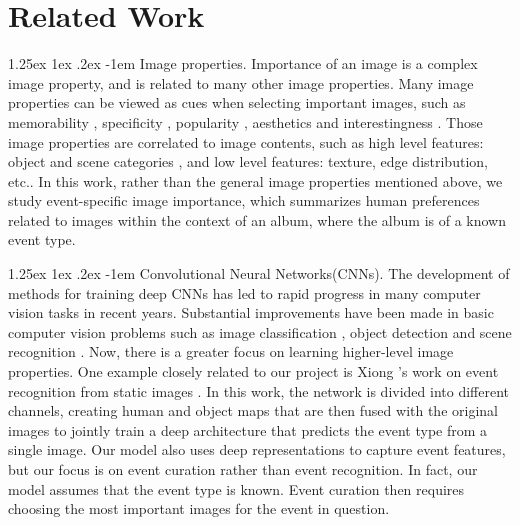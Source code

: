 \documentclass[10pt,twocolumn,letterpaper]{article}
\makeatletter
\renewcommand\paragraph{\@startsection{paragraph}{4}{\z@}%
           {1.25ex \@plus1ex \@minus.2ex}%
           {-1em}%
           {\normalfont\normalsize\bfseries}}
\makeatother
\begin{document}
\section{Related Work}

\paragraph{Image properties.}
Importance of an image is a complex image property, and is related to many other image properties. Many image properties can be viewed as cues when selecting important images, such as memorability \cite{Isola2011, NIPS2011_4451}, specificity \cite{specificity}, popularity \cite{www14_khosla}, aesthetics and interestingness \cite{interesting, interesting2}. Those image properties are correlated to image contents, such as high level features: object and scene categories \cite{Isola2011, NIPS2011_4451, specificity, www14_khosla, interesting}, and low level features: texture, edge distribution, etc.\cite{interesting2, www14_khosla}. In this work, rather than the general image properties mentioned above, we study event-specific image importance, which summarizes human preferences related to images within the context of an album, where the album is of a known event type.

\paragraph{Convolutional Neural Networks(CNNs).}
The development of methods for training deep CNNs has led to rapid progress in many computer vision tasks in recent years.  Substantial improvements have been made in basic computer vision problems such as image classification \cite{imagenet, googlenet}, object detection \cite{rcnn, devil} and scene recognition \cite{places, scene}. Now, there is a greater focus on learning higher-level image properties. One example closely related to our project is Xiong \etal's work on event recognition from static images \cite{event_recognition}. In this work, the network is divided into different channels, creating human and object maps that are then fused with the original images to jointly train a deep architecture that predicts the event type from a single image. Our model also uses deep representations to capture event features, but our  focus is on event curation rather than event recognition. In fact, our model assumes that the event type is known. Event curation then requires choosing the most important images for the event in question.
\end{document}
